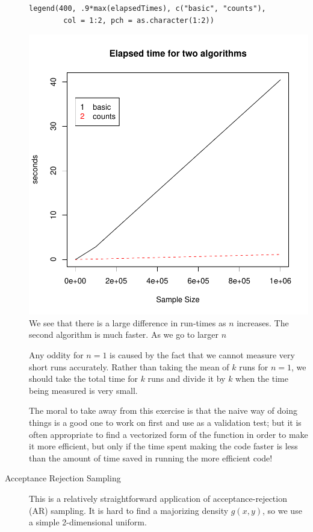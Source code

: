 \documentclass{article}
\begin{document}
\begin{description}
\begin{verbatim}
legend(400, .9*max(elapsedTimes), c("basic", "counts"), 
        col = 1:2, pch = as.character(1:2))
\end{verbatim}
\includegraphics{images/algorithmTimes.pdf}
We see that there is a large difference in run-times as $n$ increases.
The second algorithm is much faster.
As we go to larger $n$

Any oddity for $n = 1$ is caused by the fact that we cannot measure
very short runs accurately. Rather than taking the mean of
$k$ runs for $n = 1$, we should take the total time
for $k$ runs and divide it by $k$ when the time being measured
is very small.


The moral to take away from this exercise is that the naive way of
doing things is a good one to work on first and use as a validation
test; but it is often appropriate to find a vectorized form of the
function in order to make it more efficient, but only if the time
spent making the code faster is less than the amount of time saved in
running the more efficient code!


\item[Acceptance Rejection Sampling]

This is a relatively straightforward application of
acceptance-rejection (AR) sampling.  It is hard to find a majorizing
density $g(x, y)$, so we use a simple 2-dimensional uniform.


\end{description}
\end{document}
